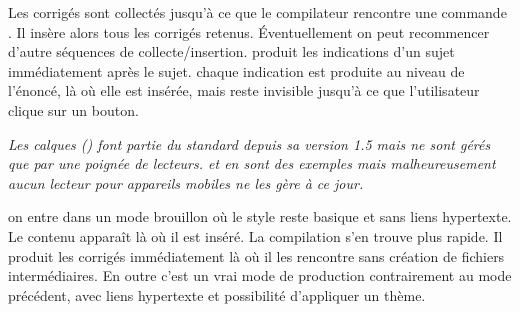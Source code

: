 \documentclass[11pt,report,oneside,solution]{cpgedev}
\let\CMD\cmd
\renewcommand\cmd[1]{{\spotcolor\CMD{#1}}}
\begin{document}
\xopt[solution*]
     Les corrigés sont collectés jusqu'à ce que le compilateur rencontre une commande . Il insère alors tous les corrigés retenus. Éventuellement on peut recommencer d'autre séquences de collecte/insertion.  
\xopt[hint]
     produit les indications d'un sujet immédiatement après le sujet. 
\xopt[hint*]
       chaque indication est produite au niveau de l'énoncé, là où elle est insérée, mais reste invisible jusqu'à ce que l'utilisateur clique sur un bouton.
      \begin{nb}\slshape
          Les calques  () font partie du standard  depuis sa version {1.5} mais ne sont gérés que par une poignée de  lecteurs.  et  en sont des exemples mais malheureusement aucun lecteur  pour appareils mobiles ne les gère à ce jour.
      \end{nb}
\xopt[draft] 
     on entre dans un mode brouillon où le style reste basique et sans liens hypertexte. Le contenu apparaît là où il est inséré. La compilation s'en trouve plus rapide. 
\xopt[straight]
      Il produit les corrigés immédiatement là où il les rencontre sans création de fichiers intermédiaires. En outre c'est un vrai mode de production contrairement au mode précédent, avec liens hypertexte et possibilité d'appliquer un thème. 
\exit 
\end{document}

